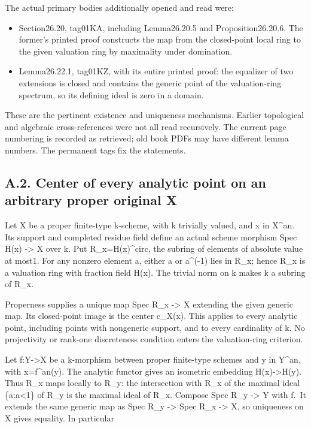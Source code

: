\documentclass[
  10pt,
]{article}
\providecommand{\tightlist}{%
  \setlength{\itemsep}{0pt}\setlength{\parskip}{0pt}}
\begin{document}
The actual primary bodies additionally opened and read were:

\begin{itemize}
\tightlist
\item
  Section26.20, tag01KA, including Lemma26.20.5 and Proposition26.20.6.
  The former's printed proof constructs the map from the closed-point
  local ring to the given valuation ring by maximality under domination.
\item
  Lemma26.22.1, tag01KZ, with its entire printed proof: the equalizer of
  two extensions is closed and contains the generic point of the
  valuation-ring spectrum, so its defining ideal is zero in a domain.
\end{itemize}

These are the pertinent existence and uniqueness mechanisms. Earlier
topological and algebraic cross-references were not all read
recursively. The current page numbering is recorded as retrieved; old
book PDFs may have different lemma numbers. The permanent tags fix the
statements.

\subsection{A.2. Center of every analytic point on an arbitrary proper
original
X}\label{a.2.-center-of-every-analytic-point-on-an-arbitrary-proper-original-x}

Let X be a proper finite-type k-scheme, with k trivially valued, and x
in X\^{}an. Its support and completed residue field define an actual
scheme morphism Spec H(x) -\textgreater{} X over k. Put
R\_x=H(x)\^{}circ, the subring of elements of absolute value at most1.
For any nonzero element a, either a or a\^{}(-1) lies in R\_x; hence
R\_x is a valuation ring with fraction field H(x). The trivial norm on k
makes k a subring of R\_x.

Properness supplies a unique map Spec R\_x -\textgreater{} X extending
the given generic map. Its closed-point image is the center c\_X(x).
This applies to every analytic point, including points with nongeneric
support, and to every cardinality of k. No projectivity or rank-one
discreteness condition enters the valuation-ring criterion.

Let f:Y-\textgreater X be a k-morphism between proper finite-type
schemes and y in Y\^{}an, with x=f\^{}an(y). The analytic functor gives
an isometric embedding H(x)-\textgreater H(y). Thus R\_x maps locally to
R\_y: the intersection with R\_x of the maximal ideal
\{a:\textbar a\textbar\textless1\} of R\_y is the maximal ideal of R\_x.
Compose Spec R\_y -\textgreater{} Y with f.~It extends the same generic
map as Spec R\_y -\textgreater{} Spec R\_x -\textgreater{} X, so
uniqueness on X gives equality. In particular
\end{document}

